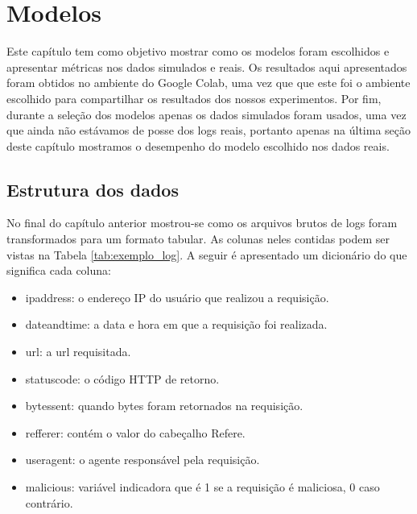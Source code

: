 
\chapter{Modelos}
\label{cap:models}

Este capítulo tem como objetivo mostrar como os modelos foram escolhidos e apresentar
métricas nos dados simulados e reais. Os resultados aqui apresentados foram obtidos no 
ambiente do Google Colab, uma vez que que este foi o ambiente escolhido para compartilhar 
os resultados dos nossos experimentos. Por fim, durante a seleção dos modelos apenas os dados 
simulados foram usados, uma vez que ainda não estávamos de posse dos logs reais, portanto 
apenas na última seção deste capítulo mostramos o desempenho do modelo escolhido nos dados reais.


\section{Estrutura dos dados}

No final do capítulo anterior mostrou-se como os arquivos brutos de logs foram transformados
para um formato tabular. As colunas neles contidas podem ser vistas na Tabela \ref{tab:exemplo_log}. 
A seguir é apresentado um dicionário do que significa cada coluna:


\begin{itemize}
    \item ipaddress: o endereço IP do usuário que realizou a requisição.
    \item dateandtime: a data e hora em que a requisição foi realizada.
    \item url: a url requisitada.
    \item statuscode: o código HTTP de retorno.
    \item bytessent: quando bytes foram retornados na requisição.
    \item refferer: contém o valor do cabeçalho Refere.
    \item useragent: o agente responsável pela requisição.
    \item malicious: variável indicadora que é 1 se a requisição é maliciosa, 0 caso contrário.
\end{itemize}


